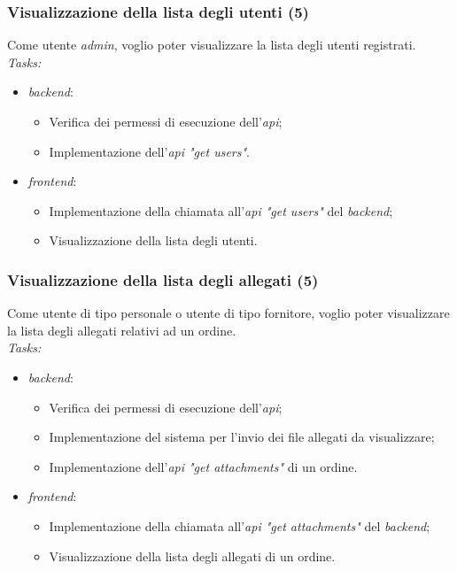 \subsubsection{Visualizzazione della lista degli utenti (5)}
Come utente \emph{admin}, voglio poter visualizzare la lista degli utenti registrati. \\
\emph{Tasks:}
\begin{itemize}
  \item \emph{\Gls{backend}}:
    \begin{itemize}
      \item Verifica dei permessi di esecuzione dell'\emph{\acrshort{api}};
      \item Implementazione dell'\emph{\acrshort{api} "get users"}.
    \end{itemize}
  \item \emph{\Gls{frontend}}:
    \begin{itemize}
      \item Implementazione della chiamata all'\emph{\acrshort{api} "get users"} del \emph{\gls{backend}};
      \item Visualizzazione della lista degli utenti.
    \end{itemize}
\end{itemize}

\subsubsection{Visualizzazione della lista degli allegati (5)}
Come utente di tipo personale o utente di tipo fornitore, voglio poter visualizzare la lista degli allegati relativi ad un ordine. \\
\emph{Tasks:}
\begin{itemize}
  \item \emph{\Gls{backend}}:
    \begin{itemize}
      \item Verifica dei permessi di esecuzione dell'\emph{\acrshort{api}};
      \item Implementazione del sistema per l'invio dei file allegati da visualizzare;
      \item Implementazione dell'\emph{\acrshort{api} "get attachments"} di un ordine.
    \end{itemize}
  \item \emph{\Gls{frontend}}:
    \begin{itemize}
      \item Implementazione della chiamata all'\emph{\acrshort{api} "get attachments"} del \emph{\gls{backend}};
      \item Visualizzazione della lista degli allegati di un ordine.
    \end{itemize}
\end{itemize}

